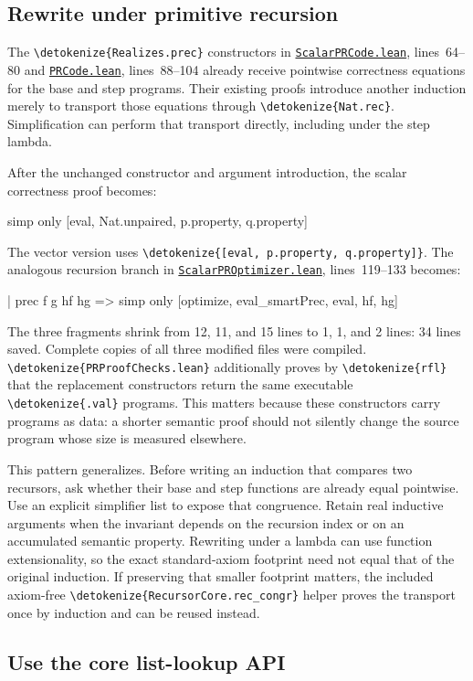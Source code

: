 \documentclass[11pt,letterpaper]{article}
\newcommand{\code}[1]{\expandafter\nolinkurl\expandafter{\detokenize{#1}}}
\newcommand{\repo}{https://github.com/VladimirReshetnikov/ProveIt/blob/60e9c5d620c6c387d932876cfa2d9376f64ea56c}
\newcommand{\src}[2]{\href{\repo/Computability/DiophantineConsistency/Lean/DiophantineConsistency/#1.lean}{\nolinkurl{#1.lean}}, lines~#2}
\begin{document}
\subsection{Rewrite under primitive recursion}

The \code{Realizes.prec} constructors in \src{ScalarPRCode}{64--80} and \src{PRCode}{88--104} already receive pointwise correctness equations for the base and step programs. Their existing proofs introduce another induction merely to transport those equations through \code{Nat.rec}. Simplification can perform that transport directly, including under the step lambda.

After the unchanged constructor and argument introduction, the scalar correctness proof becomes:
\begin{Lean}
simp only [eval, Nat.unpaired, p.property, q.property]
\end{Lean}
The vector version uses \code{[eval, p.property, q.property]}. The analogous recursion branch in \src{ScalarPROptimizer}{119--133} becomes:
\begin{Lean}
| prec f g hf hg =>
    simp only [optimize, eval_smartPrec, eval, hf, hg]
\end{Lean}

The three fragments shrink from 12, 11, and 15 lines to 1, 1, and 2 lines: 34 lines saved. Complete copies of all three modified files were compiled. \code{PRProofChecks.lean} additionally proves by \code{rfl} that the replacement constructors return the same executable \code{.val} programs. This matters because these constructors carry programs as data: a shorter semantic proof should not silently change the source program whose size is measured elsewhere.

This pattern generalizes. Before writing an induction that compares two recursors, ask whether their base and step functions are already equal pointwise. Use an explicit simplifier list to expose that congruence. Retain real inductive arguments when the invariant depends on the recursion index or on an accumulated semantic property. Rewriting under a lambda can use function extensionality, so the exact standard-axiom footprint need not equal that of the original induction. If preserving that smaller footprint matters, the included axiom-free \code{RecursorCore.rec_congr} helper proves the transport once by induction and can be reused instead.

\subsection{Use the core list-lookup API}
\end{document}
